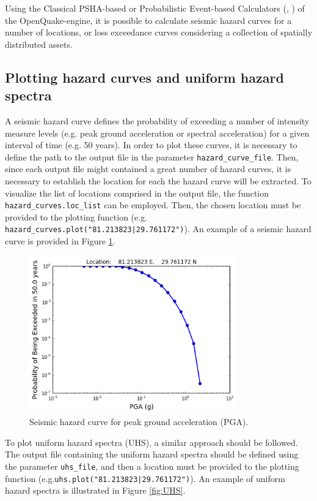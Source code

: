 Using the Classical PSHA-based or Probabilistic Event-based Calculators (\cite{SilvaEtAl2014a}, \cite{PaganiEtAl2014a}) of the OpenQuake-engine, it is possible to calculate seismic hazard curves for a number of locations, or loss exceedance curves considering a collection of spatially distributed assets.

\subsection{Plotting hazard curves and uniform hazard spectra}
\label{subsec:plot-hazard_curves}
A seismic hazard curve defines the probability of exceeding a number of intensity measure levels (e.g. peak ground acceleration or spectral acceleration) for a given interval of time (e.g. 50 years). In order to plot these curves, it is necessary to define the path to the output file in the parameter \verb=hazard_curve_file=. Then, since each output file might contained a great number of hazard curves, it is necessary to establish the location for each the hazard curve will be extracted. To visualize the list of locations comprised in the output file, the function \verb=hazard_curves.loc_list= can be employed. Then, the chosen location must be provided to the plotting function (e.g. \verb=hazard_curves.plot("81.213823|29.761172")=). An example of a seismic hazard curve is provided in Figure \ref{fig:hazard_curve}.\\

\begin{figure}[htb]
  \centering
      \includegraphics[width=9cm]{figures/hazard_curve.png}
  \caption{Seismic hazard curve for peak ground acceleration (PGA).}
  \label{fig:hazard_curve}
\end{figure}

To plot uniform hazard spectra (UHS), a similar approach should be followed. The output file containing the uniform hazard spectra should be defined using the parameter \verb=uhs_file=, and then a location must be provided to the plotting function (e.g.\verb=uhs.plot("81.213823|29.761172")=). An example of uniform hazard spectra is illustrated in Figure \ref{fig:UHS}.

